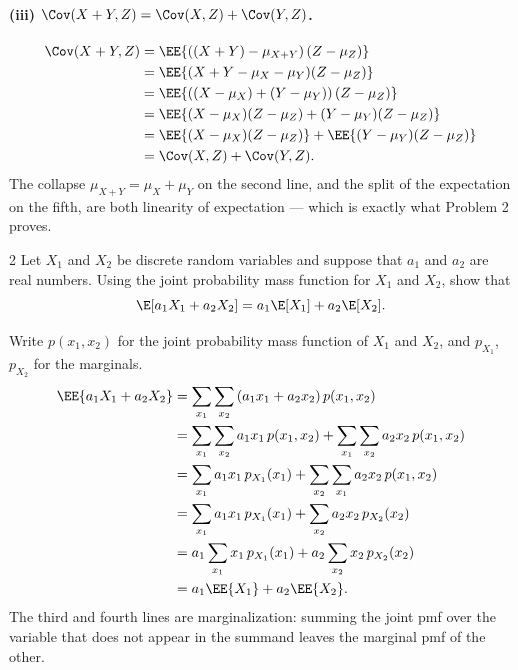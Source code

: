 \documentclass[11pt]{article}
\begin{document}
\paragraph{(iii) $\Cov(X+Y,Z) = \Cov(X,Z) + \Cov(Y,Z)$.}
\begin{align*}
  \Cov(X+Y, Z)
    &= \EE{\left((X+Y) - \mu_{X+Y}\right)(Z - \mu_{Z})}\\
    &= \EE{(X + Y - \mu_{X} - \mu_{Y})(Z - \mu_{Z})}\\
    &= \EE{\left((X - \mu_{X}) + (Y - \mu_{Y})\right)(Z - \mu_{Z})}\\
    &= \EE{(X - \mu_{X})(Z - \mu_{Z}) + (Y - \mu_{Y})(Z - \mu_{Z})}\\
    &= \EE{(X - \mu_{X})(Z - \mu_{Z})} + \EE{(Y - \mu_{Y})(Z - \mu_{Z})}\\
    &= \Cov(X,Z) + \Cov(Y,Z).
\end{align*}
The collapse $\mu_{X+Y} = \mu_{X} + \mu_{Y}$ on the second line, and the split of the
expectation on the fifth, are both linearity of expectation --- which is exactly what
Problem 2 proves.

\begin{problem}{2}
  Let $X_{1}$ and $X_{2}$ be discrete random variables and suppose that $a_{1}$
  and $a_{2}$ are real numbers. Using the joint probability mass function for
  $X_{1}$ and $X_{2}$, show that
  \[
    \E[a_{1}X_{1} + a_{2}X_{2}] = a_{1}\E[X_{1}] + a_{2}\E[X_{2}].
  \]
\end{problem}
Write $p(x_{1},x_{2})$ for the joint probability mass function of $X_{1}$ and $X_{2}$,
and $p_{X_{1}}$, $p_{X_{2}}$ for the marginals.
\begin{align*}
  \EE{a_{1}X_{1} + a_{2}X_{2}}
    &= \sum_{x_{1}}\sum_{x_{2}} \left(a_{1}x_{1} + a_{2}x_{2}\right) p(x_{1},x_{2})\\
    &= \sum_{x_{1}}\sum_{x_{2}} a_{1}x_{1}\,p(x_{1},x_{2})
       + \sum_{x_{1}}\sum_{x_{2}} a_{2}x_{2}\,p(x_{1},x_{2})\\
    &= \sum_{x_{1}} a_{1}x_{1}\,p_{X_{1}}(x_{1})
       + \sum_{x_{2}}\sum_{x_{1}} a_{2}x_{2}\,p(x_{1},x_{2})\\
    &= \sum_{x_{1}} a_{1}x_{1}\,p_{X_{1}}(x_{1})
       + \sum_{x_{2}} a_{2}x_{2}\,p_{X_{2}}(x_{2})\\
    &= a_{1}\sum_{x_{1}} x_{1}\,p_{X_{1}}(x_{1})
       + a_{2}\sum_{x_{2}} x_{2}\,p_{X_{2}}(x_{2})\\
    &= a_{1}\EE{X_{1}} + a_{2}\EE{X_{2}}.
\end{align*}
The third and fourth lines are marginalization: summing the joint pmf over the variable
that does not appear in the summand leaves the marginal pmf of the other.
\end{document}
